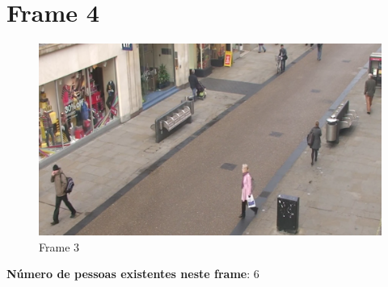 \section{Frame 4}



\begin{figure}[h]
	\centering
	\includegraphics[width=0.5\linewidth]{img/vision/frame4.png}
	\caption{Frame 3 }
	\label{db}
\end{figure}

\textbf{Número de pessoas existentes neste frame}: 6

